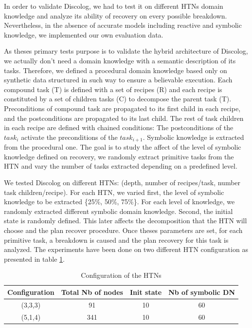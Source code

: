 \documentclass[conference]{IEEEtran}
\begin{document}
	\par In order to validate  Discolog, we had to test it on different HTNs domain knowledge and analyze its ability of recovery on every possible breakdown. Nevertheless, in the absence of accurate models including reactive and symbolic knowledge, we  implemented our own evaluation data. 
	\par As theses primary tests purpose is to validate the hybrid architecture of Discolog, we actually don't need a domain knowledge with a semantic description of its tasks. Therefore, we defined a procedural domain knowledge based only on synthetic data  structured in such way to ensure a believable execution.  Each compound task (T) is defined with a set of recipes (R) and each recipe is constituted by a set of children tasks (C) to decompose the parent task (T). Preconditions of compound task are propagated to its first child in each recipe, and the postconditions are propagated to its last child. 
	The rest of task children in each recipe are defined with chained conditions: The postconditions of the $task_i$ activate the preconditions of the $task_{i+1}$. Symbolic knowledge is extracted from the procedural one. The goal is to study the affect of the level of symbolic knowledge defined on recovery, we randomly extract primitive tasks from the HTN and vary the number of tasks extracted depending on a predefined level.  
	\par We tested Discolog on different HTNs: (depth, number of recipes/task, number task children/recipe). For each HTN, we varied first, the level of symbolic knowledge to be extracted \{25\%, 50\%, 75\%\}. For each level of knowledge, we randomly extracted different symbolic domain knowledge.  Second, the initial state is randomly defined. This later affects the decomposition that the HTN will choose and the plan recover procedure. 
	Once theses parameters are set, for each primitive task, a breakdown is caused and the plan recovery for this task is analyzed. The experiments have been done on two different HTN configuration as presented in table \ref{table}.
		\begin{table}[h]
				
				\centering %
				\caption{Configuration of the HTNs } %
				\begin{tabular}{|c|c|c|c|} 
					\hline
					Configuration & Total Nb of nodes & Init state & Nb of symbolic DN\\
					\hline
					(3,3,3) & 91 & 10 & 60  \\
					(5,1,4) & 341 & 10 & 60  \\
					\hline
				\end{tabular}
				
				
				\label{table} %
			\end{table}
			
\end{document}
